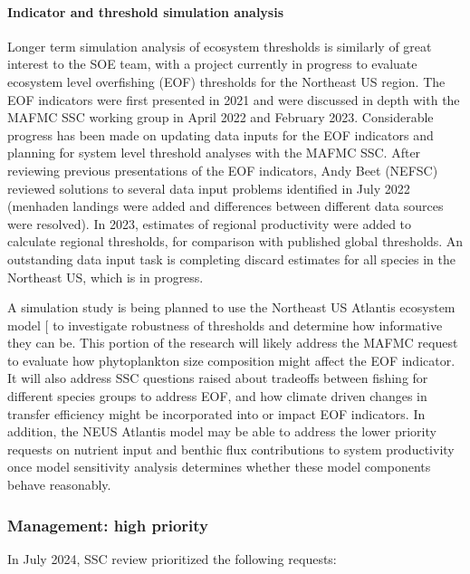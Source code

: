 \documentclass[
  10pt,
]{article}
\begin{document}
\paragraph{Indicator and threshold simulation
analysis}\label{indicator-and-threshold-simulation-analysis}

Longer term simulation analysis of ecosystem thresholds is similarly of
great interest to the SOE team, with a project currently in progress to
evaluate ecosystem level overfishing (EOF) thresholds for the Northeast
US region. The EOF indicators were first presented in 2021 and were
discussed in depth with the MAFMC SSC working group in April 2022 and
February 2023. Considerable progress has been made on updating data
inputs for the EOF indicators and planning for system level threshold
analyses with the MAFMC SSC. After reviewing previous presentations of
the EOF indicators, Andy Beet (NEFSC) reviewed solutions to several data
input problems identified in July 2022 (menhaden landings were added and
differences between different data sources were resolved). In 2023,
estimates of regional productivity were added to calculate regional
thresholds, for comparison with published global thresholds. An
outstanding data input task is completing discard estimates for all
species in the Northeast US, which is in progress.

A simulation study is being planned to use the Northeast US Atlantis
ecosystem model {[}\citeproc{ref-caracappa_northeast_2022}{5}{]} to
investigate robustness of thresholds and determine how informative they
can be. This portion of the research will likely address the MAFMC
request to evaluate how phytoplankton size composition might affect the
EOF indicator. It will also address SSC questions raised about tradeoffs
between fishing for different species groups to address EOF, and how
climate driven changes in transfer efficiency might be incorporated into
or impact EOF indicators. In addition, the NEUS Atlantis model may be
able to address the lower priority requests on nutrient input and
benthic flux contributions to system productivity once model sensitivity
analysis determines whether these model components behave reasonably.

\subsubsection{Management: high
priority}\label{management-high-priority}

In July 2024, SSC review prioritized the following requests:
\end{document}
